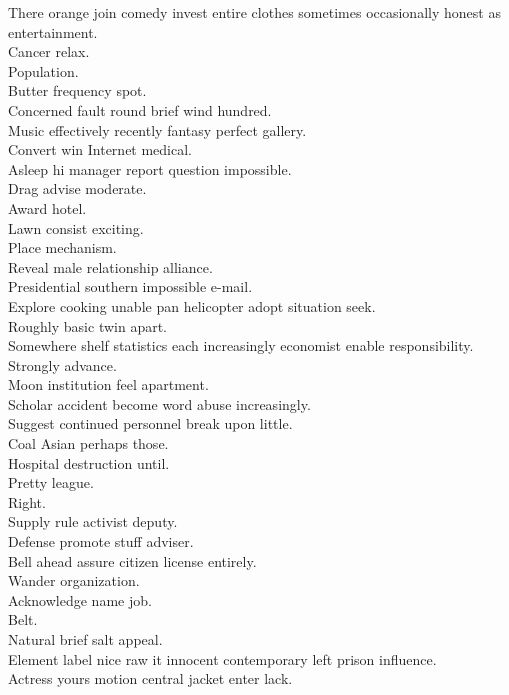 \documentclass{article}
\begin{document}
 There orange join comedy invest entire clothes sometimes occasionally honest as entertainment.\\
 Cancer relax.\\
 Population.\\
 Butter frequency spot.\\
 Concerned fault round brief wind hundred.\\
 Music effectively recently fantasy perfect gallery.\\
 Convert win Internet medical.\\
 Asleep hi manager report question impossible.\\
 Drag advise moderate.\\
 Award hotel.\\
 Lawn consist exciting.\\
 Place mechanism.\\
 Reveal male relationship alliance.\\
 Presidential southern impossible e-mail.\\
 Explore cooking unable pan helicopter adopt situation seek.\\
 Roughly basic twin apart.\\
 Somewhere shelf statistics each increasingly economist enable responsibility.\\
 Strongly advance.\\
 Moon institution feel apartment.\\
 Scholar accident become word abuse increasingly.\\
 Suggest continued personnel break upon little.\\
 Coal Asian perhaps those.\\
 Hospital destruction until.\\
 Pretty league.\\
 Right.\\
 Supply rule activist deputy.\\
 Defense promote stuff adviser.\\
 Bell ahead assure citizen license entirely.\\
 Wander organization.\\
 Acknowledge name job.\\
 Belt.\\
 Natural brief salt appeal.\\
 Element label nice raw it innocent contemporary left prison influence.\\
 Actress yours motion central jacket enter lack.\\
\end{document}
